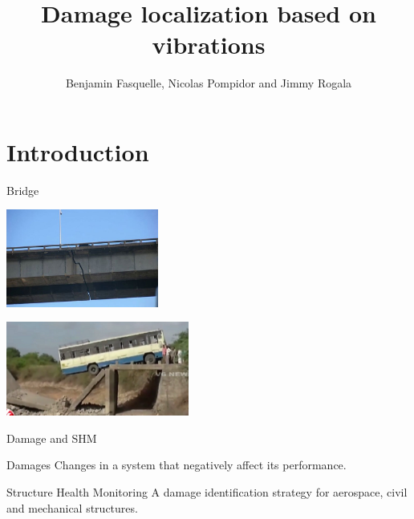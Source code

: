 \documentclass{beamer}
\title{Damage localization based on vibrations}
\author{Benjamin Fasquelle, Nicolas Pompidor and Jimmy Rogala}
\institute{École Normale Supérieure de Rennes, département Informatique et Télécommunications}
\begin{document}




  \begin{frame}
  \titlepage
  \end{frame}




\section{Introduction}

\begin{frame}{Bridge}
\begin{center}
\includegraphics[width=5cm]{images/crack.jpg}

\pause

\includegraphics[width=6cm]{images/bridge.png}
\end{center}
\end{frame}


\begin{frame}{Damage and SHM}
\begin{exampleblock}{Damages}
Changes in a system that negatively affect its performance.
\end{exampleblock}

\begin{exampleblock}{Structure Health Monitoring}
A damage identification strategy for aerospace, civil and mechanical structures.
\end{exampleblock}

\end{frame}
\end{document}

